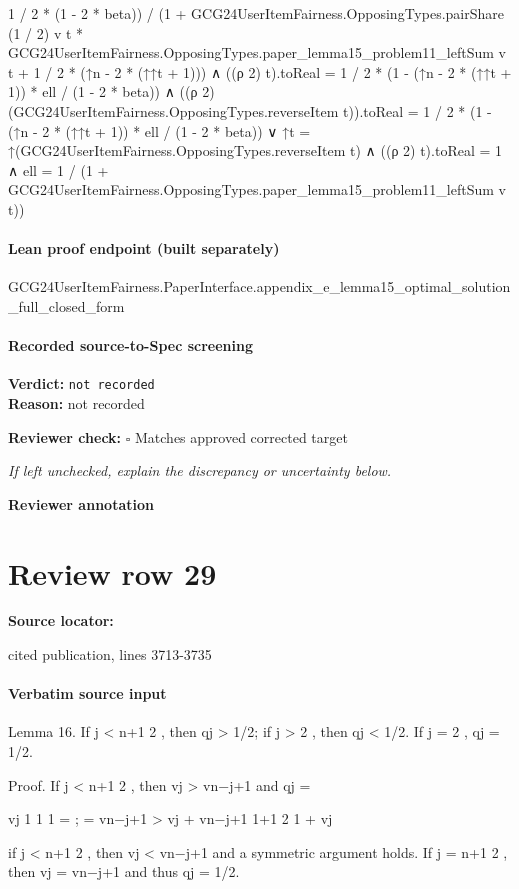 \documentclass[10pt]{article}
\newcommand{\reviewerbox}{%
  \par\noindent\fbox{\parbox{0.96\linewidth}{\rule{0pt}{0.38in}}}\par
}
\newcommand{\reviewmatch}[1]{%
  \par\noindent\textbf{Reviewer check:} $\square$\; #1\par
  \noindent\emph{If left unchecked, explain the discrepancy or uncertainty below.}\par
}
\begin{document}
\begin{ReviewVerbatim}
                                          1 / 2 * (1 - 2 * beta)) /
                                        (1 +
                                            GCG24UserItemFairness.OpposingTypes.pairShare (1 / 2) v t *
                                              GCG24UserItemFairness.OpposingTypes.paper_lemma15_problem11_leftSum v t +
                                          1 / 2 * (↑n - 2 * (↑↑t + 1))) ∧
                                    ((ρ 2) t).toReal = 1 / 2 * (1 - (↑n - 2 * (↑↑t + 1)) * ell / (1 - 2 * beta)) ∧
                                      ((ρ 2) (GCG24UserItemFairness.OpposingTypes.reverseItem t)).toReal =
                                        1 / 2 * (1 - (↑n - 2 * (↑↑t + 1)) * ell / (1 - 2 * beta)) ∨
                                ↑t = ↑(GCG24UserItemFairness.OpposingTypes.reverseItem t) ∧
                                  ((ρ 2) t).toReal = 1 ∧
                                    ell =
                                      1 / (1 + GCG24UserItemFairness.OpposingTypes.paper_lemma15_problem11_leftSum v t))
\end{ReviewVerbatim}

\paragraph{Lean proof endpoint (built separately)}\begin{ReviewVerbatim}
GCG24UserItemFairness.PaperInterface.appendix_e_lemma15_optimal_solution_full_closed_form
\end{ReviewVerbatim}

\paragraph{Recorded source-to-Spec screening}
\textbf{Verdict:} \texttt{not recorded}
\\
\textbf{Reason:} not recorded
\reviewmatch{Matches approved corrected target}
\noindent\textbf{Reviewer annotation}\par
\reviewerbox
\clearpage
\hypertarget{source-claim-fa20503a4cc73d27}{}
\section*{Review row 29}
\textbf{Source locator:} {\footnotesize\raggedright cited publication, lines 3713-\allowbreak{}3735\par}
\paragraph{Verbatim source input}
\begin{ReviewVerbatim}
Lemma 16. If j < n+1
2 , then qj > 1/2; if j > 2 , then qj < 1/2. If j = 2 , qj = 1/2.

Proof. If j < n+1
2 , then vj > vn−j+1 and
qj =

vj
1
1
1
= ;
=
vn−j+1 >
vj + vn−j+1
1+1
2
1 + vj

if j < n+1
2 , then vj < vn−j+1 and a symmetric argument holds.
If j = n+1
2 , then vj = vn−j+1 and thus qj = 1/2.
\end{ReviewVerbatim}
\end{document}
